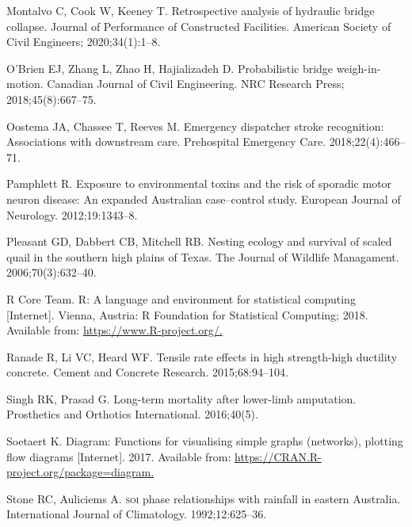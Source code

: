 \documentclass[
  11pt,
  a4paper,
  krantz2]{krantz}
\newlength{\cslhangindent}
\newenvironment{CSLReferences}[2] %
 {\begin{list}{}{%
  \setlength{\itemindent}{0pt}
  \setlength{\leftmargin}{0pt}
  \setlength{\parsep}{0pt}
  \ifodd #1
   \setlength{\leftmargin}{\cslhangindent}
   \setlength{\itemindent}{-1\cslhangindent}
  \fi
  \setlength{\itemsep}{#2\baselineskip}}}
 {\end{list}}
\begin{document}
\begin{footnotesize}
\begin{CSLReferences}{1}{0}
Montalvo C, Cook W, Keeney T. Retrospective analysis of hydraulic bridge collapse. Journal of Performance of Constructed Facilities. American Society of Civil Engineers; 2020;34(1):1--8.

O'Brien EJ, Zhang L, Zhao H, Hajializadeh D. Probabilistic bridge weigh-in-motion. {C}anadian Journal of Civil Engineering. NRC Research Press; 2018;45(8):667--75.

Oostema JA, Chassee T, Reeves M. Emergency dispatcher stroke recognition: Associations with downstream care. Prehospital Emergency Care. 2018;22(4):466--71.

Pamphlett R. Exposure to environmental toxins and the risk of sporadic motor neuron disease: An expanded {A}ustralian case--control study. {E}uropean Journal of Neurology. 2012;19:1343--8.

Pleasant GD, Dabbert CB, Mitchell RB. Nesting ecology and survival of scaled quail in the southern high plains of {T}exas. The Journal of Wildlife Managament. 2006;70(3):632--40.

R Core Team. {R}: A language and environment for statistical computing {[}Internet{]}. Vienna, Austria: R Foundation for Statistical Computing; 2018. Available from: \href{https://www.R-project.org/}{https://www.R-project.org/.}

Ranade R, Li VC, Heard WF. Tensile rate effects in high strength-high ductility concrete. Cement and Concrete Research. 2015;68:94--104.

Singh RK, Prasad G. Long-term mortality after lower-limb amputation. Prosthetics and Orthotics International. 2016;40(5).

Soetaert K. Diagram: Functions for visualising simple graphs (networks), plotting flow diagrams {[}Internet{]}. 2017. Available from: \href{https://CRAN.R-project.org/package=diagram}{https://CRAN.R-project.org/package=diagram.}

Stone RC, Auliciems A. {\textsc{soi}} phase relationships with rainfall in eastern {A}ustralia. International Journal of Climatology. 1992;12:625--36.


\end{CSLReferences}
\end{footnotesize}
\end{document}
